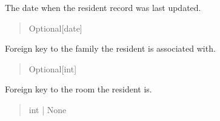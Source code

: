 \documentclass[letterpaper,10pt,english]{sphinxmanual}
\begin{document}
\begin{fulllineitems}
\begin{fulllineitems}
\begin{quote}
\begin{description}
\end{description}\end{quote}

\end{fulllineitems}


\begin{fulllineitems}
\label{\detokenize{app.models:app.models.resident.Resident.update}}
\pysigstartsignatures
\pysigline
{}
\pysigstopsignatures
\sphinxAtStartPar
The date when the resident record was last updated.
\begin{quote}\begin{description}
\sphinxAtStartPar
Optional{[}date{]}

\end{description}\end{quote}

\end{fulllineitems}


\begin{fulllineitems}
\label{\detokenize{app.models:app.models.resident.Resident.idFamily}}
\pysigstartsignatures
\pysigline
{}
\pysigstopsignatures
\sphinxAtStartPar
Foreign key to the family the resident is associated with.
\begin{quote}\begin{description}
\sphinxAtStartPar
Optional{[}int{]}

\end{description}\end{quote}

\end{fulllineitems}


\begin{fulllineitems}
\label{\detokenize{app.models:app.models.resident.Resident.idRoom}}
\pysigstartsignatures
\pysigline
{}
\pysigstopsignatures
\sphinxAtStartPar
Foreign key to the room the resident is.
\begin{quote}\begin{description}
\sphinxAtStartPar
int | None

\end{description}\end{quote}

\end{fulllineitems}


\end{fulllineitems}
\end{document}
